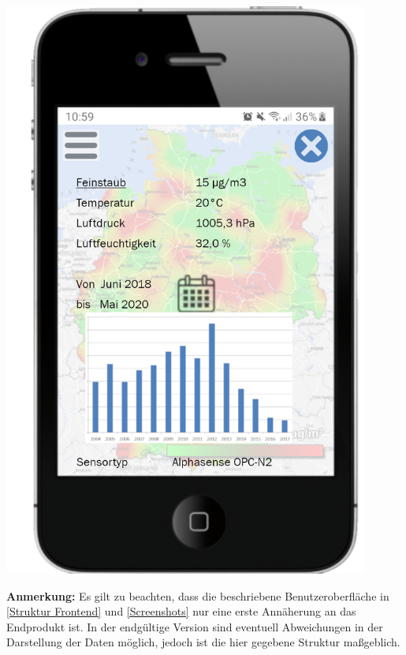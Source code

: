 \begin{center}
	\includegraphics[width=0.9\textwidth]{media/AktuelleDaten-Mobile-Version} 
\end{center}

\textbf{Anmerkung:}
Es gilt zu beachten, dass die beschriebene Benutzeroberfläche in \autoref{Struktur Frontend} und \autoref{Screenshots} nur eine erste Annäherung an das Endprodukt ist. In der endgültige Version sind eventuell Abweichungen in der Darstellung der Daten möglich, jedoch ist die hier gegebene Struktur maßgeblich.
